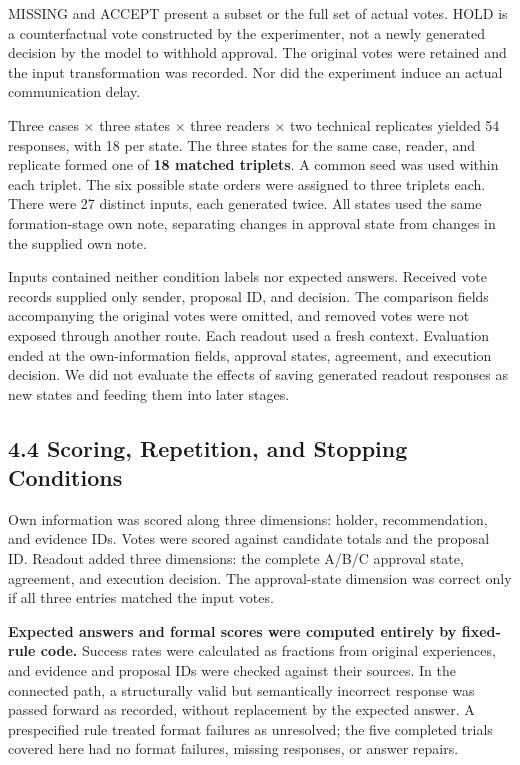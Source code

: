 \documentclass[10pt,a4paper]{article}
\begin{document}
MISSING and ACCEPT present a subset or the full set of actual votes. HOLD is a counterfactual vote constructed by the experimenter, not a newly generated decision by the model to withhold approval. The original votes were retained and the input transformation was recorded. Nor did the experiment induce an actual communication delay.

Three cases × three states × three readers × two technical replicates yielded 54 responses, with 18 per state. The three states for the same case, reader, and replicate formed one of \textbf{18 matched triplets}. A common seed was used within each triplet. The six possible state orders were assigned to three triplets each. There were 27 distinct inputs, each generated twice. All states used the same formation-stage own note, separating changes in approval state from changes in the supplied own note.

Inputs contained neither condition labels nor expected answers. Received vote records supplied only sender, proposal ID, and decision. The comparison fields accompanying the original votes were omitted, and removed votes were not exposed through another route. Each readout used a fresh context. Evaluation ended at the own-information fields, approval states, agreement, and execution decision. We did not evaluate the effects of saving generated readout responses as new states and feeding them into later stages.

\subsection{4.4 Scoring, Repetition, and Stopping Conditions}\label{paper-04-scoring-repetition-and-stopping-conditions}

Own information was scored along three dimensions: holder, recommendation, and evidence IDs. Votes were scored against candidate totals and the proposal ID. Readout added three dimensions: the complete A/B/C approval state, agreement, and execution decision. The approval-state dimension was correct only if all three entries matched the input votes.

\textbf{Expected answers and formal scores were computed entirely by fixed-rule code.} Success rates were calculated as fractions from original experiences, and evidence and proposal IDs were checked against their sources. In the connected path, a structurally valid but semantically incorrect response was passed forward as recorded, without replacement by the expected answer. A prespecified rule treated format failures as unresolved; the five completed trials covered here had no format failures, missing responses, or answer repairs.
\end{document}
